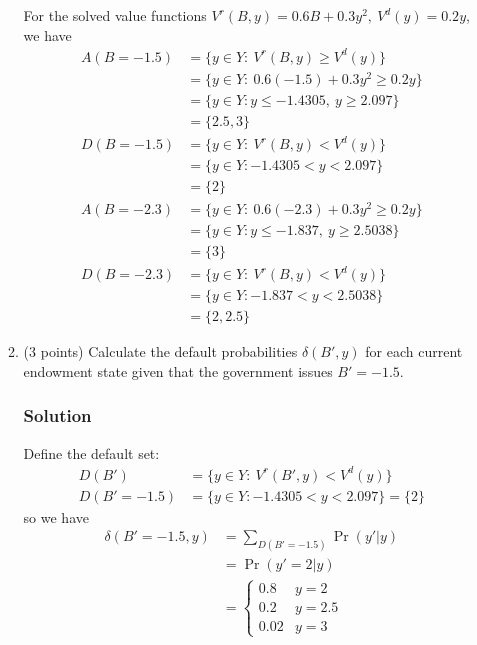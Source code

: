 \documentclass[12pt]{article}
\begin{document}
\begin{enumerate}
\begin{enumerate}[label=(\alph*)]
        For the solved value functions $V^r(B, y) = 0.6B + 0.3y^2, \ V^d(y) = 0.2y$, we have
        \begin{align*}
            A(B=-1.5) &= \{ y \in Y: \ V^r(B,y) \geq V^d(y) \} 
            \\ &=  \{ y \in Y: \ 0.6(-1.5) + 0.3y^2 \geq 0.2y \} 
            \\ &= \{ y \in Y: y\leq -1.4305,\  y \geq 2.097 \} 
            \\ &= \{ 2.5, 3\}
            \\ D(B=-1.5) &= \{ y \in Y: \ V^r(B,y) < V^d(y) \} 
            \\ &= \{ y \in Y: -1.4305 <  y < 2.097 \} 
            \\ &= \{2\}
            \\ A(B=-2.3) &= \{ y \in Y: \ 0.6(-2.3) + 0.3y^2 \geq 0.2y \} 
            \\ &= \{ y \in Y: y\leq -1.837,\  y \geq 2.5038 \} 
            \\ &= \{3\}
             \\ D(B=-2.3) &= \{ y \in Y: \ V^r(B,y) < V^d(y) \} 
            \\ &= \{ y \in Y: -1.837<  y < 2.5038 \} 
            \\ &= \{ 2,2.5\}
        \end{align*}

        \item (3 points) Calculate the default probabilities $\delta(B', y)$ for each current endowment state given that the government issues $B' = -1.5$.
        \subsubsection*{Solution}

        Define the default set: 
        \begin{align*}
            D(B') &= \{ y \in Y: \ V^r(B',y) < V^d(y) \} 
            \\ D(B'=-1.5) &= \{ y \in Y: -1.4305 <  y < 2.097 \}
            = \{ 2\}
        \end{align*}
         so we have 
        \begin{align*}
            \delta(B'= -1.5, y) &= \sum_{D(B'= -1.5)} \Pr(y'|y)
            \\ &=\Pr(y'=2|y)
       \\ & = \begin{cases}
            0.8& y=2
            \\ 0.2 & y=2.5
            \\ 0.02 & y=3
        \end{cases}
        \end{align*}


\end{enumerate}
\end{enumerate}
\end{document}
